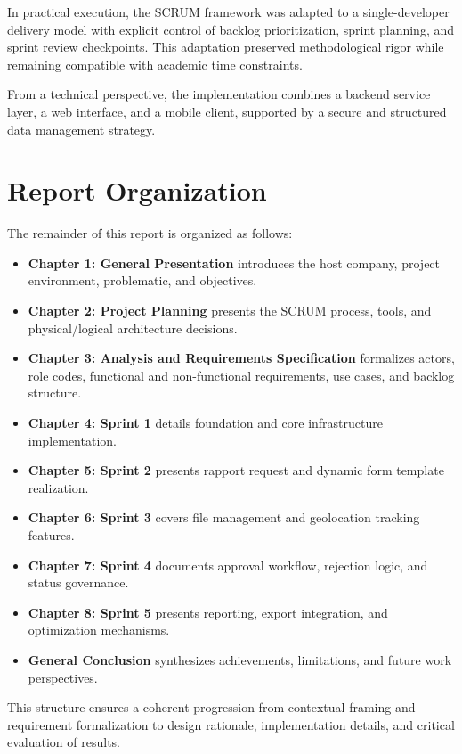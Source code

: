 In practical execution, the SCRUM framework was adapted to a single-developer delivery model with explicit control of backlog prioritization, sprint planning, and sprint review checkpoints. This adaptation preserved methodological rigor while remaining compatible with academic time constraints.

From a technical perspective, the implementation combines a backend service layer, a web interface, and a mobile client, supported by a secure and structured data management strategy.

\section{Report Organization}

The remainder of this report is organized as follows:

\begin{itemize}
\item \textbf{Chapter 1: General Presentation} introduces the host company, project environment, problematic, and objectives.
\item \textbf{Chapter 2: Project Planning} presents the SCRUM process, tools, and physical/logical architecture decisions.
\item \textbf{Chapter 3: Analysis and Requirements Specification} formalizes actors, role codes, functional and non-functional requirements, use cases, and backlog structure.
\item \textbf{Chapter 4: Sprint 1} details foundation and core infrastructure implementation.
\item \textbf{Chapter 5: Sprint 2} presents rapport request and dynamic form template realization.
\item \textbf{Chapter 6: Sprint 3} covers file management and geolocation tracking features.
\item \textbf{Chapter 7: Sprint 4} documents approval workflow, rejection logic, and status governance.
\item \textbf{Chapter 8: Sprint 5} presents reporting, export integration, and optimization mechanisms.
\item \textbf{General Conclusion} synthesizes achievements, limitations, and future work perspectives.
\end{itemize}

This structure ensures a coherent progression from contextual framing and requirement formalization to design rationale, implementation details, and critical evaluation of results.
